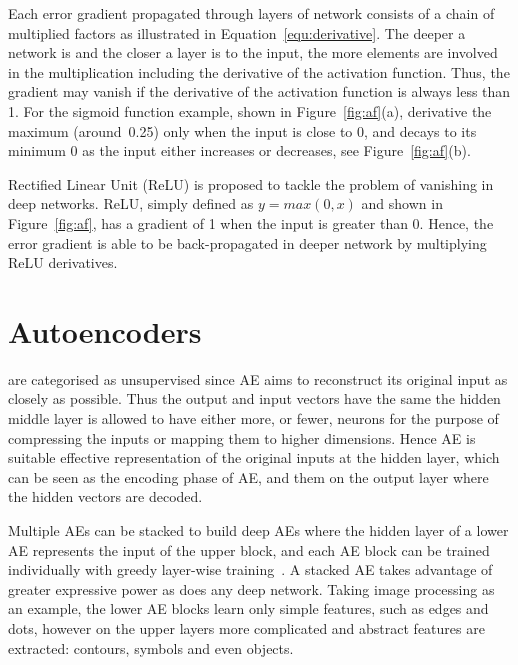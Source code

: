 Each error gradient propagated through layers of \protect{} network consists of a chain of multiplied factors as illustrated in Equation~\ref{equ:derivative}.
The deeper a network is and the closer a layer is to the input, the more elements are involved in the multiplication including the derivative of the activation function.
Thus, the gradient may vanish if the derivative of the activation function is always less than 1.
For the sigmoid function example, shown in Figure~\ref{fig:af}(a), \protect{} \protect{} derivative \protect{} \protect{} the maximum (around~0.25) only when the input is close to 0, and decays to its minimum 0 as the input either increases or decreases, see Figure~\ref{fig:af}(b).

\protect{} Rectified Linear Unit (ReLU) is proposed to tackle the problem of vanishing \protect{} \protect{} in deep networks.
ReLU, simply defined as $y = max(0,x)$ and shown in Figure~\ref{fig:af}, has a gradient of 1 when the input is greater than 0.
Hence, the error gradient is able to be back-propagated in deeper network by multiplying ReLU derivatives.

\section{Autoencoders}
\label{sec:AE}
\protect{}
\protect{} are categorised as unsupervised \protect{} \protect{} since AE aims to reconstruct its original input as closely as possible.
Thus the output and input vectors have the same \protect{} \protect{} the hidden middle layer is allowed to have either more, or fewer, neurons for the purpose of compressing the inputs or mapping them to higher dimensions.
Hence \protect{} AE is suitable \protect{} \protect{} effective representation of the original inputs at the hidden layer, which can be seen as the encoding phase of \protect{} AE, and \protect{} \protect{} them on the output layer where the hidden vectors are decoded. 

Multiple AEs can be stacked to build deep AEs where the hidden layer of a lower AE represents the input of the upper block, and each AE block can be trained individually with greedy layer-wise training~\citep{hinton2006fast}.
A stacked AE takes advantage of greater expressive power as does any deep network.
Taking image processing as an example, the lower AE blocks learn only simple features, such as edges and dots, however on the upper layers more complicated and abstract features are extracted: contours, symbols and even objects. 

